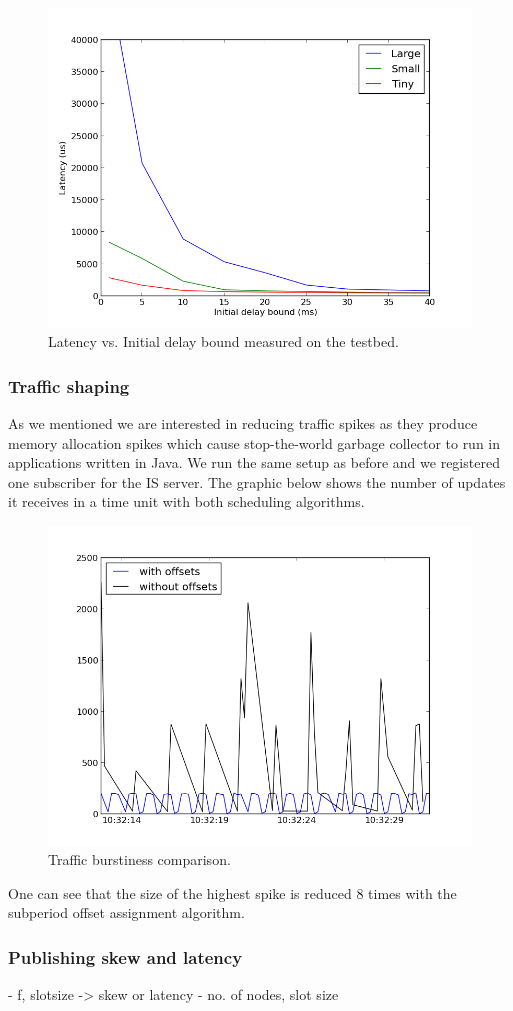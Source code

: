 \begin{figure}[ht]
\centering
\includegraphics[scale=0.4]{Images/one_slot_tbed_latency.png}
\caption{Latency vs. Initial delay bound measured on the testbed.}
\label{fig:one_slot_tbed_latency}
\end{figure}




\subsubsection*{Traffic shaping}

As we mentioned we are interested in reducing traffic spikes as they produce memory allocation spikes which cause stop-the-world garbage collector to run in applications written in Java. We run the same setup as before and we registered one subscriber for the IS server. The graphic below shows the number of updates it receives in a time unit with both scheduling algorithms. 

\begin{figure}[H]
\centering
\includegraphics[scale=0.6]{Images/burstiness.png}
\caption{Traffic burstiness comparison.}
\end{figure}

One can see that the size of the highest spike is reduced 8 times with the subperiod offset assignment algorithm.

\subsubsection*{Publishing skew and latency}

- f, slotsize -> skew or latency
- no. of nodes, slot size



